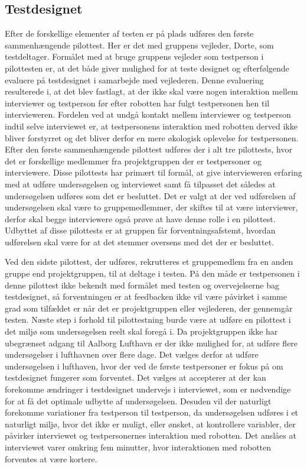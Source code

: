 \subsection{Testdesignet}
\label{ParametrePilotTestdesign}
%
Efter de forskellige elementer af testen er på plads udføres den første sammenhængende pilottest. Her er det med gruppens vejleder, Dorte, som testdeltager. Formålet med at bruge gruppens vejleder som testperson i pilottesten er, at det både giver mulighed for at teste designet og efterfølgende evaluere på testdesignet i samarbejde med vejlederen. Denne evaluering resulterede i, at det blev fastlagt, at der ikke skal være nogen interaktion mellem interviewer og testperson før efter robotten har fulgt testpersonen hen til intervieweren. Fordelen ved at undgå kontakt mellem interviewer og testperson indtil selve interviewet er, at testpersonens interaktion med robotten derved ikke bliver forstyrret og det bliver derfor en mere økologisk oplevelse for testpersonen. \blankline
%
Efter den første sammenhængende pilottest udføres der i alt tre pilottests, hvor det er forskellige medlemmer fra projektgruppen der er testpersoner og interviewere. Disse pilottests har primært til formål, at give intervieweren erfaring med at udføre undersøgelsen og interviewet samt få tilpasset det således at undersøgelsen udføres som det er besluttet. Det er valgt at der ved udførelsen af undersøgelsen skal være to gruppemedlemmer, der skiftes til at være interviewer, derfor skal begge interviewere også prøve at have denne rolle i en pilottest. Udbyttet af disse pilottests er at gruppen får forventningsafstemt, hvordan udførelsen skal være for at det stemmer oversens med det der er besluttet.

Ved den sidste pilottest, der udføres, rekrutteres et gruppemedlem fra en anden gruppe end projektgruppen, til at deltage i testen. På den måde er testpersonen i denne pilottest ikke bekendt med formålet med testen og overvejelserne bag testdesignet, så forventningen er at feedbacken ikke vil være påvirket i samme grad som tilfældet er når det er projektgruppen eller vejlederen, der gennemgår testen. \blankline
%
Næste step i forhold til pilottestning burde være at udføre en pilottest i det miljø som undersøgelsen reelt skal foregå i. Da projektgruppen ikke har ubegrænset adgang til Aalborg Lufthavn er der ikke mulighed for, at udføre flere undersøgelser i lufthavnen over flere dage. Det vælges derfor at udføre undersøgelsen i lufthaven, hvor der ved de første testpersoner er fokus på om testdesignet fungerer som forventet. Det vælges at accepterer at der kan forekomme ændringer i testdesignet undervejs i interviewet, som er nødvendige for at få det optimale udbytte af undersøgelsen. Desuden vil der naturligt forekomme variationer fra testperson til testperson, da undersøgelsen udføres i et naturligt miljø, hvor det ikke er muligt, eller ønsket, at kontrollere variabler, der påvirker interviewet og testpersonernes interaktion med robotten. Det anslåes at interviewet varer omkring fem minutter, hvor interaktionen med robotten forventes at være kortere. 
